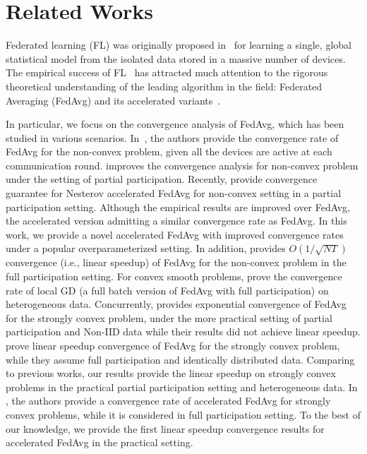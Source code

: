 
\section{Related Works}

Federated learning (FL) was originally proposed
in~\cite{mcmahan2016communication} for learning a single, global statistical
model from the isolated data stored in a massive number of devices.  The
empirical success of FL~\cite{chen2018federated,47586} has attracted much attention to the rigorous theoretical understanding of the leading algorithm in the field: Federated Averaging (FedAvg) and its accelerated variants~\cite{liu2019accelerating,haddadpour2019convergence,khaled2019first,li2019convergence,huo2020faster,yu2019linear,yu2019parallel}.

In particular, we focus on the convergence analysis of FedAvg, which
has been studied in various scenarios. 
In~\cite{yu2019parallel,wang2019adaptive}, the authors provide the convergence rate of FedAvg for the non-convex problem, given all the devices are active at each communication round. \cite{haddadpour2019convergence}
improves the convergence analysis for non-convex problem under the setting of partial participation. 
Recently, \citep{huo2020faster} provide
convergence guarantee for Nesterov accelerated FedAvg for non-convex 
setting in a partial participation setting. Although the empirical
results are improved over FedAvg, the accelerated version admitting a similar convergence rate as FedAvg. In this work, we provide a novel accelerated
FedAvg with improved convergence rates under a popular overparameterized setting. In addition, \cite{yu2019linear} provides $O(1/\sqrt{NT})$ 
convergence (i.e., linear speedup) of FedAvg for the non-convex problem in the full participation setting. 
For convex smooth problems, \cite{khaled2019first} prove the 
convergence rate of local GD (a full batch version of FedAvg with full participation) on heterogeneous data. 
Concurrently, \cite{li2019convergence} provides exponential convergence of FedAvg for the strongly convex problem,
under the more practical setting of partial participation and Non-IID data while their results did not achieve linear speedup. 
\cite{stich2018local} prove linear speedup convergence of FedAvg for the strongly convex problem, while they assume full participation and identically distributed data. Comparing to previous works, our results provide the linear speedup on strongly convex problems in the practical partial participation setting and heterogeneous data. In \cite{liu2019accelerating}, the authors provide a convergence rate of accelerated FedAvg for strongly convex problems, while it is considered in full participation setting. To the best of our knowledge,
we provide the first linear speedup convergence results for accelerated FedAvg in the practical setting.









